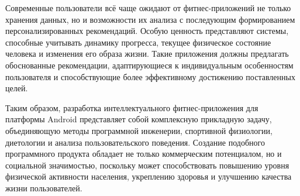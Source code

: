 Современные пользователи всё чаще ожидают от фитнес-приложений не только хранения данных, но и возможности их анализа с последующим формированием персонализированных рекомендаций. Особую ценность представляют системы, способные учитывать динамику прогресса, текущее физическое состояние человека и изменения его образа жизни. Такие приложения должны предлагать обоснованные рекомендации, адаптирующиеся к индивидуальным особенностям пользователя и способствующие более эффективному достижению поставленных целей.

Таким образом, разработка интеллектуального фитнес-приложения для платформы Android представляет собой комплексную прикладную задачу, объединяющую методы программной инженерии, спортивной физиологии, диетологии и анализа пользовательского поведения. Создание подобного программного продукта обладает не только коммерческим потенциалом, но и социальной значимостью, поскольку может способствовать повышению уровня физической активности населения, укреплению здоровья и улучшению качества жизни пользователей.
